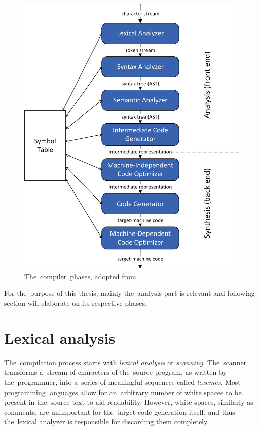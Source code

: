 \documentclass[
  digital, %
  table,   %
  lof,     %
  lot,     %
  oneside,
]{fithesis3}
\begin{document}
\begin{figure}[h!]
		\centering
			\includegraphics[scale=0.80]{img/compiler-phases}
		\caption{The~compiler~phases, adopted from~\cite{dragon-book}}
		\label{fig:compiler-phases}
\end{figure}

For the~purpose of this thesis, mainly the~analysis part is relevant and following section will elaborate on its respective phases.

  \section{Lexical analysis}
The~compilation process starts with \textit{lexical analysis} or \textit{scanning}. The~scanner transforms a~stream of characters of the~source program, as written by the~programmer, into a~series of meaningful sequences called \textit{lexemes}. Most programming languages allow for an~arbitrary number of white spaces to be present in the~source text to aid readability. However, white spaces, similarly as comments, are unimportant for the~target code generation itself, and thus the~lexical analyzer is responsible for discarding them completely.
\end{document}
